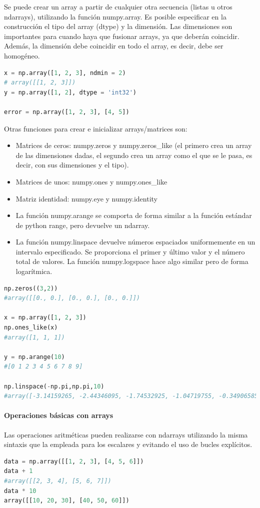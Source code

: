Se puede crear un array a partir de cualquier otra secuencia (listas u otros ndarrays), utilizando la función numpy.array. Es posible especificar en la construcción el tipo del array (dtype) y la dimensión. Las dimensiones son importantes para cuando haya que fusionar arrays, ya que deberán coincidir. Además, la dimensión debe coincidir en todo el array, es decir, debe ser homogéneo.
\begin{lstlisting}[language=Python]
x = np.array([1, 2, 3], ndmin = 2)
# array([[1, 2, 3]])
y = np.array([1, 2], dtype = 'int32')

error = np.array([1, 2, 3], [4, 5])
\end{lstlisting}

Otras funciones para crear e inicializar arrays/matrices son:
\begin{itemize}
\item Matrices de ceros: numpy.zeros y numpy.zeros\_like (el primero crea un array de las dimensiones dadas, el segundo crea un array como el que se le pasa, es decir, con sus dimensiones y el tipo).
\item Matrices de unos: numpy.ones y numpy.ones\_like
\item Matriz identidad: numpy.eye y numpy.identity
\item La función numpy.arange se comporta de forma similar a la función estándar de python range, pero devuelve un ndarray.
\item La función numpy.linspace devuelve números espaciados uniformemente en un intervalo especificado. Se proporciona el primer y último valor y el número total de valores. La función numpy.logspace hace algo similar pero de forma logarítmica.
\end{itemize}

\begin{lstlisting}[language=Python]
np.zeros((3,2))
#array([[0., 0.], [0., 0.], [0., 0.]])

x = np.array([1, 2, 3])
np.ones_like(x)
#array([1, 1, 1])

y = np.arange(10)
#[0 1 2 3 4 5 6 7 8 9]

np.linspace(-np.pi,np.pi,10)
#array([-3.14159265, -2.44346095, -1.74532925, -1.04719755, -0.34906585, 0.34906585,  1.04719755,  1.74532925,  2.44346095,  3.14159265])
\end{lstlisting}

\paragraph{Operaciones básicas con arrays}
Las operaciones aritméticas pueden realizarse con ndarrays utilizando la misma sintaxis que la empleada para los escalares y evitando el uso de bucles explícitos. 
\begin{lstlisting}[language=Python]
data = np.array([[1, 2, 3], [4, 5, 6]])
data + 1
#array([[2, 3, 4], [5, 6, 7]])
data * 10
array([[10, 20, 30], [40, 50, 60]])
\end{lstlisting}

